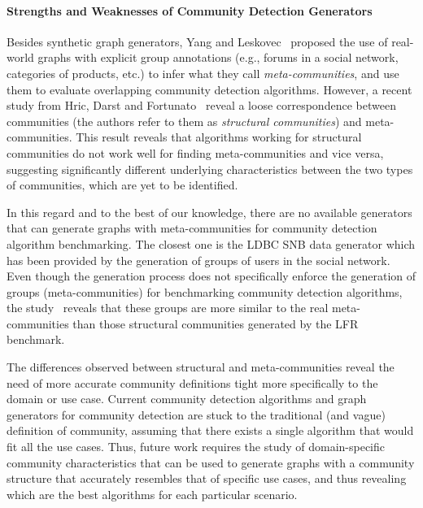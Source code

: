 \paragraph{Strengths and Weaknesses of Community Detection Generators}
Besides synthetic graph generators, Yang and Leskovec~\cite{yang2015defining}
proposed the use of real-world graphs with explicit group annotations (e.g.,
forums in a social network, categories of products, etc.) to infer what they
call \emph{meta-communities}, and use them to evaluate overlapping community
detection algorithms. However, a recent study from Hric, Darst and
Fortunato~\cite{hric2014community} reveal a loose correspondence between
communities (the authors refer to them as \emph{structural communities}) and
meta-communities.  This result reveals that  algorithms working for structural
communities do not work well for finding meta-communities and vice versa,
suggesting significantly different underlying characteristics
between the two types of communities, which are yet to be
identified.

In this regard and to the best of our knowledge, there are no available 
generators that can generate graphs with meta-communities for community detection
algorithm benchmarking. The closest one is the LDBC SNB data
generator which has been provided by the
generation of groups of users in the social network. Even though the generation
process does not specifically enforce the generation of groups
(meta-communities) for benchmarking community detection algorithms, the study~\cite{Prat-Perez:2014:CSS:2621934.2621942} reveals that these groups are more similar
to the real meta-communities than those structural communities generated by the
LFR benchmark.

The differences observed between structural and meta-communities reveal the need
of more accurate community definitions tight more specifically to the domain or
use case. Current community detection algorithms and graph generators for
community detection are stuck to the traditional (and vague) definition of
community, assuming that there exists a single algorithm that would fit all the
use cases. Thus, future work requires the study of domain-specific community
characteristics that can be used to generate graphs with a community structure
that accurately resembles that of specific use cases, and thus revealing which
are the best algorithms for each particular scenario.

